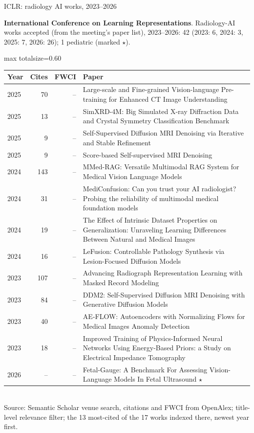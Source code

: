 \documentclass[aspectratio=169]{beamer}
\renewcommand{\arraystretch}{1.08}
\begin{document}
\begin{frame}[category=Conferences]{ICLR: radiology AI works, 2023--2026}
{\scriptsize \textbf{International Conference on Learning Representations}. Radiology-AI works accepted (from the meeting's paper list), 2023--2026: 42 (2023: 6, 2024: 3, 2025: 7, 2026: 26); 1 pediatric (marked $\star$).\par}\vspace{2pt}
\tiny
\begin{adjustbox}{max totalsize={\textwidth}{0.60\textheight}}
\renewcommand{\arraystretch}{1.2}
\begin{tabular}{|l|r|r|>{\raggedright\arraybackslash}p{}|}
\hline \textbf{Year} & \textbf{Cites} & \textbf{FWCI} & \textbf{Paper} \\ \hline
2025 & 70 & -- & Large-scale and Fine-grained Vision-language Pre-training for Enhanced CT Image Understanding \\ \hline
2025 & 13 & -- & SimXRD-4M: Big Simulated X-ray Diffraction Data and Crystal Symmetry Classification Benchmark \\ \hline
2025 & 9 & -- & Self-Supervised Diffusion MRI Denoising via Iterative and Stable Refinement \\ \hline
2025 & 9 & -- & Score-based Self-supervised MRI Denoising \\ \hline
2024 & 143 & -- & MMed-RAG: Versatile Multimodal RAG System for Medical Vision Language Models \\ \hline
2024 & 31 & -- & MediConfusion: Can you trust your AI radiologist? Probing the reliability of multimodal medical foundation models \\ \hline
2024 & 19 & -- & The Effect of Intrinsic Dataset Properties on Generalization: Unraveling Learning Differences Between Natural and Medical Images \\ \hline
2024 & 16 & -- & LeFusion: Controllable Pathology Synthesis via Lesion-Focused Diffusion Models \\ \hline
2023 & 107 & -- & Advancing Radiograph Representation Learning with Masked Record Modeling \\ \hline
2023 & 84 & -- & DDM2: Self-Supervised Diffusion MRI Denoising with Generative Diffusion Models \\ \hline
2023 & 40 & -- & AE-FLOW: Autoencoders with Normalizing Flows for Medical Images Anomaly Detection \\ \hline
2023 & 18 & -- & Improved Training of Physics-Informed Neural Networks Using Energy-Based Priors: a Study on Electrical Impedance Tomography \\ \hline
2026 & -- & -- & Fetal-Gauge: A Benchmark For Assessing Vision-Language Models In Fetal Ultrasound $\star$ \\ \hline
\end{tabular}
\end{adjustbox}
\\[2pt]
{\tiny Source: Semantic Scholar venue search, citations and FWCI from OpenAlex; title-level relevance filter; the 13 most-cited of the 17 works indexed there, newest year first.}
\end{frame}
\end{document}
